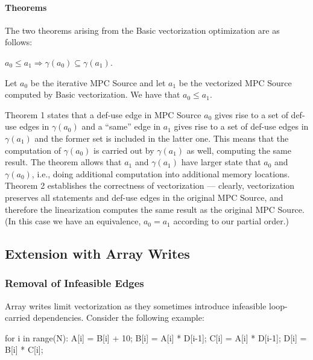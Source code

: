 \paragraph{Theorems} The two theorems arising from the Basic vectorization optimization are as follows: 

\begin{theorem} $a_0 \le a_1 \Rightarrow \gamma(a_0) \subseteq \gamma(a_1)$.
\end{theorem}

\begin{theorem} Let $a_0$ be the iterative MPC Source and let $a_1$ be the vectorized MPC Source computed by Basic vectorization. 
We have that $a_0 \le a_1$. 
\end{theorem}

Theorem 1 states that a def-use edge in MPC Source $a_0$ gives rise to a set of def-use edges in $\gamma(a_0)$
and a ``same'' edge in $a_1$ gives rise to a set of def-use edges in $\gamma(a_1)$ and the former set is included in the latter one.
This means that the computation of $\gamma(a_0)$ is carried out by $\gamma(a_1)$ as well, computing the same result. 
The theorem allows that $a_1$ and $\gamma(a_1)$ have larger state that $a_0$ and $\gamma(a_0)$, i.e., doing additional 
computation into additional memory locations. Theorem 2 establishes the correctness of vectorization --- 
clearly, vectorization preserves all statements and def-use edges in the original MPC Source, and therefore the linearization computes the 
same result as the original MPC Source. (In this case we have an equivalence, $a_0 = a_1$ according to our partial order.)

\subsection{Extension with Array Writes}
\label{sec:extension_with_writes}

\subsubsection{Removal of Infeasible Edges}

Array writes limit vectorization as they sometimes introduce infeasible loop-carried dependencies. Consider the following example: 

{\small
\begin{pythonn}
for i in range(N):
  A[i] = B[i] + 10;
  B[i] = A[i] * D[i-1];
  C[i] = A[i] * D[i-1];
  D[i] = B[i] * C[i];
\end{pythonn}
}

